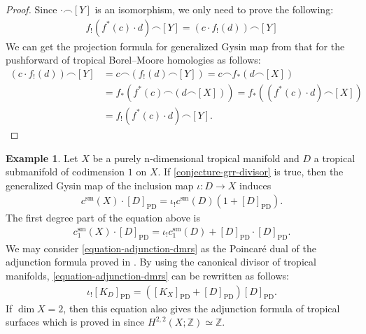 \documentclass[a4paper,dvipdfmx,reqno,12pt]{amsart}
\theoremstyle{definition}
\newtheorem{example}[theorem]{Example}
\newcommand{\PD}[1]{[#1]_{\mathrm{PD}}}
\numberwithin{equation}{section}
\begin{document}
\begin{proof}
Since $\cdot \frown [Y]$ is an isomorphism, we only need
to prove the following:
\begin{align}
    f_!(f^{*}(c)\cdot d)\frown [Y]=(c\cdot f_!(d))\frown [Y]
\end{align}
We can get the projection formula for generalized Gysin
map from that for the pushforward of tropical 
Borel--Moore homologies as follows:
\begin{align}
(c\cdot f_!(d))\frown [Y]&=
c\frown(f_!(d)\frown [Y])=
c\frown f_*(d\frown [X])\\
&=f_*(f^*(c)\frown (d\frown [X]))
=f_*((f^*(c)\cdot d) \frown [X]) \\
&=f_!(f^{*}(c)\cdot d)\frown [Y].
\end{align}
\end{proof}

\begin{example}
\label{example-grr-1}
Let $X$ be a purely n-dimensional tropical manifold
and $D$ a tropical submanifold of codimension $1$ on 
$X$. If 
\cref{conjecture-grr-divisor} is true, then
the generalized Gysin map of the
inclusion map
$\iota\colon D\to X$ induces
\begin{align}
c^{\mathrm{sm}}(X)\cdot \PD{D}=\iota_!c^{\mathrm{sm}}(D)
(1+\PD{D}).
\end{align}
The first degree part of the equation above is
\begin{align}
\label{equation-adjunction-dmrs}
c^{\mathrm{sm}}_{1}(X)\cdot \PD{D}=\iota_!c^{\mathrm{sm}}_1(D)
+\PD{D}\cdot \PD{D}.
\end{align}
We may consider \cref{equation-adjunction-dmrs} as 
the Poincar\'e dual of the adjunction formula proved in
\cite[Theorem 5.2]{demedrano2023chern}.
By using the canonical divisor of tropical manifolds,
\eqref{equation-adjunction-dmrs} can be rewritten as follows:
\begin{align}
\iota_! \PD{K_D}=(\PD{K_X}+\PD{D})\PD{D}.
\end{align}
If $\dim X=2$, then this equation also gives
the adjunction formula of tropical surfaces which is proved
in \cite[Theorem 4.11]{shaw2015tropical}
since $H^{2,2}(X;\mathbb{Z})\simeq \mathbb{Z}$.
\end{example}
\end{document}
